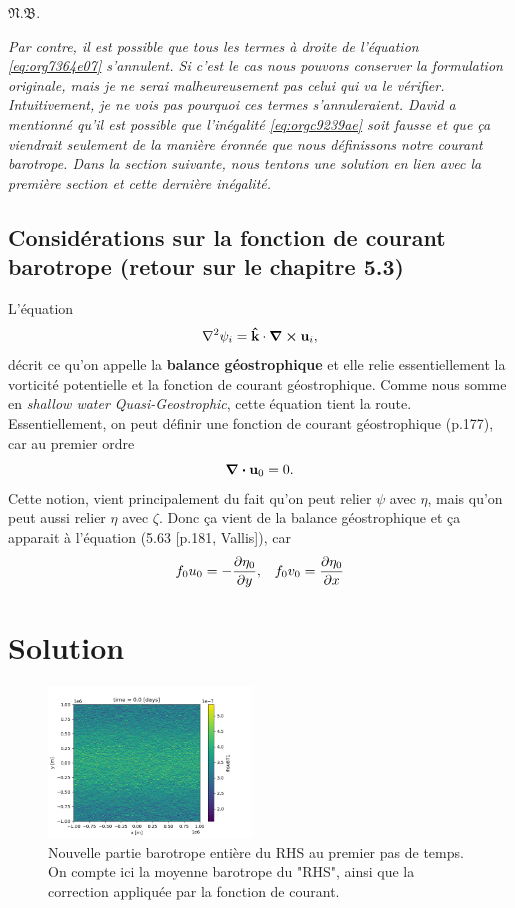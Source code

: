 \documentclass[10pt]{article}
\numberwithin{equation}{section}
\newcommand{\kvf}{\vb{\hat{k}}}
\newcommand{\uu}{\vb{u}}
\newcommand{\pt}{\hspace{1pt}} %
\newcommand{\nb}{\underline{{\footnotesize\EightStarConvex}\pt $\mathfrak{N.B.}$\vphantom{p}}\hspace{3pt}}
\begin{document}
\nb\begin{minipage}[t]{0.9\linewidth}
\itshape Par contre, il est possible que tous les termes à droite de l'équation \ref{eq:org7364e07} s'annulent.
Si c'est le cas nous pouvons conserver la formulation originale, mais je ne serai malheureusement pas celui qui va le vérifier.
Intuitivement, je ne vois pas pourquoi ces termes s'annuleraient.
David a mentionné qu'il est possible que l'inégalité \ref{eq:orgc9239ae} soit fausse et que ça viendrait seulement de la manière éronnée que nous définissons notre courant barotrope.
Dans la section suivante, nous tentons une solution en lien avec la première section et cette dernière inégalité.
\end{minipage}
\subsection{Considérations sur la fonction de courant barotrope (retour sur le chapitre 5.3)}
\label{sec:org5698cdc}
L'équation
\begin{equation}
   \laplacian{\psi_i} = \kvf\cdot\curl{\uu_i},
\end{equation}
décrit ce qu'on appelle la \textbf{balance géostrophique} et elle relie essentiellement la vorticité potentielle et la fonction de courant géostrophique.
Comme nous somme en \emph{shallow water Quasi-Geostrophic}, cette équation tient la route.
Essentiellement, on peut définir une fonction de courant géostrophique (p.177), car au premier ordre
\begin{equation}
   \divergence{\uu_0} = 0.
\end{equation}
Cette notion, vient principalement du fait qu'on peut relier \(\psi\) avec \(\eta\), mais qu'on peut aussi relier \(\eta\) avec \(\zeta\).
Donc ça vient de la balance géostrophique et ça apparait à l'équation (5.63 [p.181, Vallis]), car
\begin{align}
&&f_0 u_0 = -\pdv{\eta_0}{y},
&& f_0 v_0 = \pdv{\eta_0}{x} &&
\end{align}
\section{Solution}
\label{sec:orgd0a3eff}
\begin{figure} \vspace{-\baselineskip} \centering
\centering
\includegraphics[width=0.48\textwidth]{figures/debuggage/2023_06_14_RHSuBTmudpack.png}
\caption{\label{fig:orgc006394}Nouvelle partie barotrope entière du RHS au premier pas de temps. On compte ici la moyenne barotrope du "RHS", ainsi que la correction appliquée par la fonction de courant.}
\end{figure}
\end{document}
